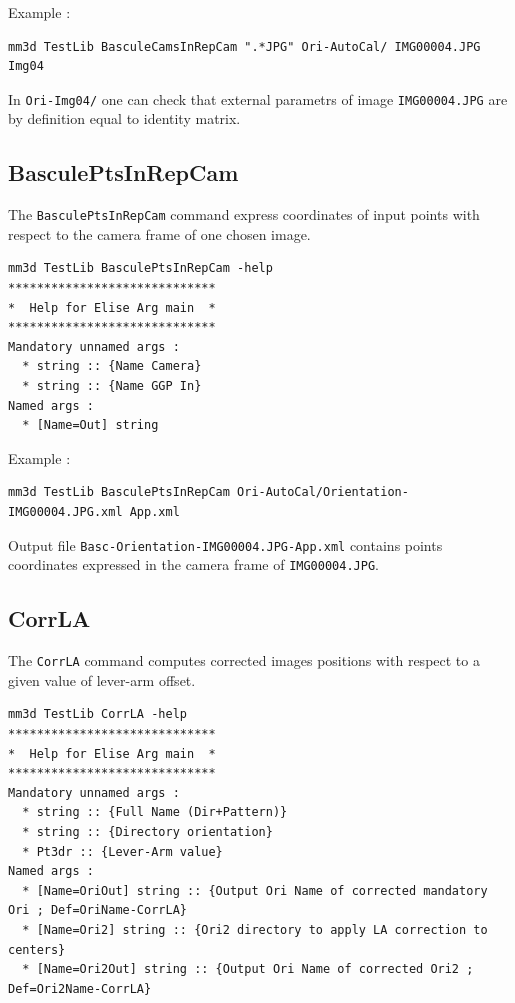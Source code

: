 Example :
\begin{verbatim}
mm3d TestLib BasculeCamsInRepCam ".*JPG" Ori-AutoCal/ IMG00004.JPG Img04
\end{verbatim}

In {\tt Ori-Img04/} one can check that external parametrs of image {\tt IMG00004.JPG} are by definition equal to identity matrix.

\subsection{BasculePtsInRepCam}
The {\tt BasculePtsInRepCam} command express coordinates of input points with respect to the camera frame of one chosen image.

\begin{verbatim}
mm3d TestLib BasculePtsInRepCam -help
*****************************
*  Help for Elise Arg main  *
*****************************
Mandatory unnamed args : 
  * string :: {Name Camera}
  * string :: {Name GGP In}
Named args : 
  * [Name=Out] string
\end{verbatim}

Example :
\begin{verbatim}
mm3d TestLib BasculePtsInRepCam Ori-AutoCal/Orientation-IMG00004.JPG.xml App.xml
\end{verbatim}

Output file {\tt Basc-Orientation-IMG00004.JPG-App.xml} contains points coordinates expressed in the camera frame of {\tt IMG00004.JPG}.

\subsection{CorrLA}
The {\tt CorrLA} command computes corrected images positions with respect to a given value of lever-arm offset.

\begin{verbatim}
mm3d TestLib CorrLA -help
*****************************
*  Help for Elise Arg main  *
*****************************
Mandatory unnamed args : 
  * string :: {Full Name (Dir+Pattern)}
  * string :: {Directory orientation}
  * Pt3dr :: {Lever-Arm value}
Named args : 
  * [Name=OriOut] string :: {Output Ori Name of corrected mandatory Ori ; Def=OriName-CorrLA}
  * [Name=Ori2] string :: {Ori2 directory to apply LA correction to centers}
  * [Name=Ori2Out] string :: {Output Ori Name of corrected Ori2 ; Def=Ori2Name-CorrLA}
\end{verbatim}


